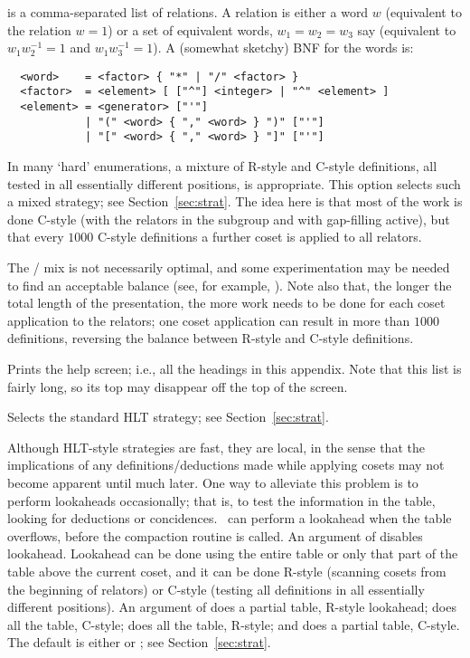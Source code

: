  is a comma-separated list of relations.
A relation is either a word $w$ (equivalent to the relation $w=1$) or
  a set of equivalent words, $w_1=w_2=w_3$ say (equivalent to
  $w_1w^{-1}_2=1$ and $w_1w^{-1}_3=1$).
A (somewhat sketchy) BNF for the words is:

\bv\begin{verbatim}
  <word>    = <factor> { "*" | "/" <factor> }
  <factor>  = <element> [ ["^"] <integer> | "^" <element> ]
  <element> = <generator> ["'"]
            | "(" <word> { "," <word> } ")" ["'"]
            | "[" <word> { "," <word> } "]" ["'"]
\end{verbatim}\ev

\quad{}

In many `hard' enumerations, a mixture of R-style and C-style definitions,
  all tested in all essentially different positions, is appropriate.
This option selects such a mixed strategy; see Section~\ref{sec:strat}.
The idea here is that most of the work is done C-style (with the relators
  in the subgroup and with gap-filling active), but that every $1000$
  C-style definitions a further coset is applied to all relators.

The / mix is not necessarily optimal, and some
  experimentation may be needed to find an acceptable balance (see, for
  example, \cite{HR1}).
Note also that, the longer the total length of the presentation, the more
  work needs to be done for each coset application to the relators; one
  coset application can result in more than $1000$ definitions, reversing
  the balance between R-style and C-style definitions.

\quad{}

Prints the help screen; i.e., all the headings in this appendix.
Note that this list is fairly long, so its top may disappear off the top 
  of the screen.

\quad{}

Selects the standard HLT strategy; see Section~\ref{sec:strat}.

\quad{}

Although HLT-style strategies are fast, they are local, in the sense that
  the implications of any definitions/deductions made while applying cosets
  may not become apparent until much later.
One way to alleviate this problem is to perform lookaheads occasionally;
  that is, to test the information in the table, looking for deductions
  or concidences.
\ace\ can perform a lookahead when the table overflows, before the
  compaction routine is called.
An argument of  disables lookahead.
Lookahead can be done using the entire table or only that part of the table
  above the current coset, and it can be done R-style (scanning cosets
  from the beginning of relators) or C-style (testing all definitions in
  all essentially different positions).
An argument of  does a partial table, R-style lookahead; 
  does all the table, C-style;  does all the table, R-style; and 
   does a partial table, C-style.
The default is either  or ; see Section~\ref{sec:strat}.


